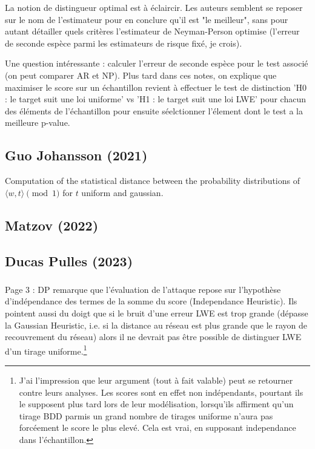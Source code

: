\documentclass{article}
\begin{document}
La notion de distingueur optimal est à éclaircir. Les auteurs semblent se reposer sur le nom de l'estimateur pour en conclure qu'il est "le meilleur", sans pour autant détailler quels critères l'estimateur de Neyman-Person optimise (l'erreur de seconde espèce parmi les estimateurs de risque fixé, je crois).

Une question intéressante : calculer l'erreur de seconde espèce pour le test associé (on peut comparer AR et NP). Plus tard dans ces notes, on explique que maximiser le score sur un échantillon revient à effectuer le test de distinction 'H0 : le target suit une loi uniforme' vs 'H1 : le target suit une loi LWE' pour chacun des éléments de l'échantillon pour ensuite séelctionner l'élement dont le test a la meilleure p-value.

\subsection{Guo Johansson (2021)}

Computation of the statistical distance between the probability distributions of $\langle w , t \rangle \pmod{1}$ for $t$ uniform and gaussian.  

\subsection{Matzov (2022)}

\subsection{Ducas Pulles (2023)}%

\subsubsection{} Page 3 : DP remarque que l'évaluation de l'attaque repose sur l'hypothèse d'indépendance des termes de la somme du score (Independance Heuristic). Ils pointent aussi du doigt que si le bruit d'une erreur LWE est trop grande (dépasse la Gaussian Heuristic, i.e. si la distance au réseau est plus grande que le rayon de recouvrement du réseau) alors il ne devrait pas être possible de distinguer LWE d'un tirage uniforme.\footnote{J'ai l'impression que leur argument (tout à fait valable) peut se retourner contre leurs analyses. Les scores sont en effet non indépendants, pourtant ils le supposent plus tard lors de leur modélisation, lorsqu'ils affirment qu'un tirage BDD parmis un grand nombre de tirages uniforme n'aura pas forcéement le score le plus elevé. Cela est vrai, en supposant independance dans l'échantillon.}
\end{document}
